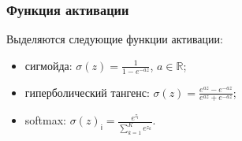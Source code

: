 \documentclass[unicode, notheorems]{beamer}
\begin{document}
\begin{frame}
	\frametitle{Функция активации}
	 Выделяются следующие функции активации:
		\begin{itemize}
			\item сигмойда: $\sigma(z) = \frac{1}{1 - e^{-az}}$, $a \in \mathbb{R}$;
			\item гиперболический тангенс: $\sigma(z) = \frac{e^{az} - e^{-az}}{e^{az} + e^{-az}}$;
			\item softmax: $\sigma(z)_{\mathsf{i}} = \frac{e^{z_{\mathsf{i}}}}{\sum \limits_{k=1}^{K} e^{z_{k}} }$.
		\end{itemize}
	
\end{frame}







 		
\end{document}
